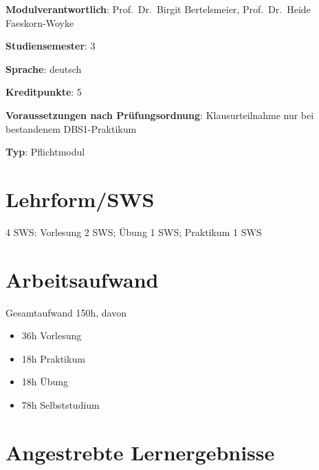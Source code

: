 \begin{modulHead}
\textbf{Modulverantwortlich}: Prof.~Dr.~Birgit
Bertelsmeier, Prof.~Dr.~Heide
Faeskorn-Woyke
\end{modulHead}
\begin{modulHead}
\textbf{Studiensemester}:
3
\end{modulHead}
\begin{modulHead}
\textbf{Sprache}:
deutsch
\end{modulHead}
\begin{modulHead}
\textbf{Kreditpunkte}:
5
\end{modulHead}
\begin{modulHead}
\textbf{Voraussetzungen nach
Prüfungsordnung}: Klausurteilnahme nur bei bestandenem
DBS1-Praktikum
\end{modulHead}
\begin{modulHead}
\textbf{Typ}:
Pflichtmodul
\end{modulHead}


\section*{Lehrform/SWS\label{/mi-2017/modulbeschreibungen-bachelor/BA_Datenbanken1}}\label{lehrformswspathlabelmi-2017modulbeschreibungen-bachelorbaux5fdatenbanken1}

4 SWS: Vorlesung 2 SWS; Übung 1 SWS; Praktikum 1 SWS

\section*{Arbeitsaufwand\label{/mi-2017/modulbeschreibungen-bachelor/BA_Datenbanken1}}\label{arbeitsaufwandpathlabelmi-2017modulbeschreibungen-bachelorbaux5fdatenbanken1}

Gesamtaufwand 150h, davon

\begin{itemize}
\tightlist
\item
  36h Vorlesung
\item
  18h Praktikum
\item
  18h Übung
\item
  78h Selbststudium
\end{itemize}

\section*{Angestrebte
Lernergebnisse\label{/mi-2017/modulbeschreibungen-bachelor/BA_Datenbanken1}}\label{angestrebte-lernergebnissepathlabelmi-2017modulbeschreibungen-bachelorbaux5fdatenbanken1}

